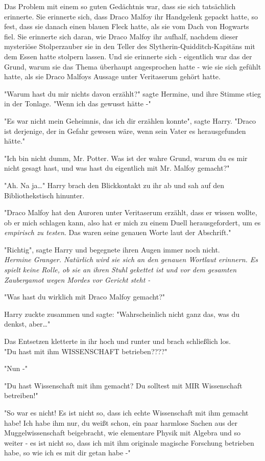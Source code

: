 {Das Problem mit einem so guten Gedächtnis war, dass sie sich tatsächlich erinnerte. Sie erinnerte sich, dass Draco Malfoy ihr Handgelenk gepackt hatte, so fest, dass sie danach einen blauen Fleck hatte, als sie vom Dach von Hogwarts fiel. Sie erinnerte sich daran, wie Draco Malfoy ihr aufhalf, nachdem dieser mysteriöse Stolperzauber sie in den Teller des Slytherin-Quidditch-Kapitäns mit dem Essen hatte stolpern lassen. Und sie erinnerte sich - eigentlich war das der Grund, warum sie das Thema überhaupt angesprochen hatte - wie sie sich gefühlt hatte, als sie Draco Malfoys Aussage unter Veritaserum gehört hatte.

"Warum hast du mir nichts davon erzählt?" sagte Hermine, und ihre Stimme stieg in der Tonlage. "Wenn ich das gewusst hätte -"

"Es war nicht mein Geheimnis, das ich dir erzählen konnte", sagte Harry. "Draco ist derjenige, der in Gefahr gewesen wäre, wenn sein Vater es herausgefunden hätte."

"Ich bin nicht dumm, Mr. Potter. Was ist der wahre Grund, warum du es mir nicht gesagt hast, und was hast du eigentlich mit Mr. Malfoy gemacht?"

"Ah. Na ja…" Harry brach den Blickkontakt zu ihr ab und sah auf den Bibliothekstisch hinunter.

"Draco Malfoy hat den Auroren unter Veritaserum erzählt, dass er wissen wollte, ob er mich schlagen kann, also hat er mich zu einem Duell herausgefordert, um es \emph{empirisch zu testen}. Das waren seine genauen Worte laut der Abschrift."

"Richtig", sagte Harry und begegnete ihren Augen immer noch nicht.\\ \emph{Hermine Granger. Natürlich wird sie sich an den genauen Wortlaut erinnern. Es spielt keine Rolle, ob sie an ihren Stuhl gekettet ist und vor dem gesamten Zaubergamot wegen Mordes vor Gericht steht -}

"Was hast du wirklich mit Draco Malfoy gemacht?"

Harry zuckte zusammen und sagte: "Wahrscheinlich nicht ganz das, was du denkst, aber…"

Das Entsetzen kletterte in ihr hoch und runter und brach schließlich los.\\ "Du hast mit ihm WISSENSCHAFT betrieben????"

"Nun -"

"Du hast Wissenschaft mit ihm gemacht? Du solltest mit MIR Wissenschaft betreiben!"

"So war es nicht! Es ist nicht so, dass ich echte Wissenschaft mit ihm gemacht habe! Ich habe ihm nur, du weißt schon, ein paar harmlose Sachen aus der Muggelwissenschaft beigebracht, wie elementare Physik mit Algebra und so weiter - es ist nicht so, dass ich mit ihm originale magische Forschung betrieben habe, so wie ich es mit dir getan habe -"

}
